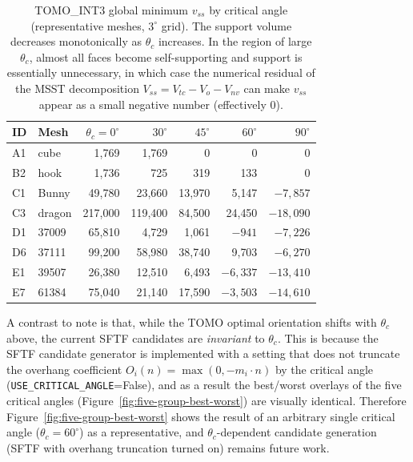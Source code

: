 \documentclass[11pt,a4paper]{article}
\begin{document}
\begin{table}[H]
\footnotesize
\centering
\caption{TOMO\_INT3 global minimum $v_{ss}$ by critical angle (representative meshes, $3^\circ$ grid).
The support volume decreases monotonically as $\theta_c$ increases.
In the region of large $\theta_c$, almost all faces become self-supporting and support is essentially unnecessary,
in which case the numerical residual of the MSST decomposition $V_{ss}=V_{tc}-V_o-V_{nv}$ can make $v_{ss}$ appear as a small negative number (effectively $0$).}
\label{tab:critangle}
\begin{tabular}{llrrrrr}
\toprule
ID & Mesh & $\theta_c{=}0^\circ$ & $30^\circ$ & $45^\circ$ & $60^\circ$ & $90^\circ$\\
\midrule
A1 & cube   & 1{,}769   & 1{,}769   & 0        & 0         & 0\\
B2 & hook   & 1{,}736   & 725       & 319      & 133       & 0\\
C1 & Bunny  & 49{,}780  & 23{,}660  & 13{,}970 & 5{,}147   & $-7{,}857$\\
C3 & dragon & 217{,}000 & 119{,}400 & 84{,}500 & 24{,}450  & $-18{,}090$\\
D1 & 37009  & 65{,}810  & 4{,}729   & 1{,}061  & $-941$    & $-7{,}226$\\
D6 & 37111  & 99{,}200  & 58{,}980  & 38{,}740 & 9{,}703   & $-6{,}270$\\
E1 & 39507  & 26{,}380  & 12{,}510  & 6{,}493  & $-6{,}337$ & $-13{,}410$\\
E7 & 61384  & 75{,}040  & 21{,}140  & 17{,}590 & $-3{,}503$ & $-14{,}610$\\
\bottomrule
\end{tabular}
\end{table}

A contrast to note is that, while the TOMO optimal orientation shifts with $\theta_c$ above,
the current SFTF candidates are \emph{invariant} to $\theta_c$.
This is because the SFTF candidate generator is implemented with a setting that does not truncate the overhang coefficient $O_i(n)=\max(0,-m_i\cdot n)$ by the critical angle
(\texttt{USE\_CRITICAL\_ANGLE}=False),
and as a result the best/worst overlays of the five critical angles (Figure~\ref{fig:five-group-best-worst}) are visually identical.
Therefore Figure~\ref{fig:five-group-best-worst} shows the result of an arbitrary single critical angle ($\theta_c=60^\circ$) as a representative,
and $\theta_c$-dependent candidate generation (SFTF with overhang truncation turned on) remains future work.
\end{document}
